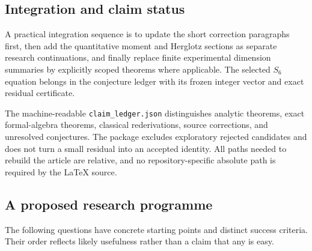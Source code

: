 \subsection{Integration and claim status}

A practical integration sequence is to update the short correction
paragraphs first, then add the quantitative moment and Herglotz
sections as separate research continuations, and finally replace
finite experimental dimension summaries by explicitly scoped theorems
where applicable. The selected \(S_6\) equation belongs in the
conjecture ledger with its frozen integer vector and exact residual
certificate.

The machine-readable \texttt{claim\_ledger.json} distinguishes
analytic theorems, exact formal-algebra theorems, classical
rederivations, source corrections, and unresolved conjectures.
The package excludes exploratory rejected candidates and does not
turn a small residual into an accepted identity. All paths needed
to rebuild the article are relative, and no repository-specific
absolute path is required by the LaTeX source.

\subsection{A proposed research programme}

The following questions have concrete starting points and distinct
success criteria. Their order reflects likely usefulness rather than
a claim that any is easy.

